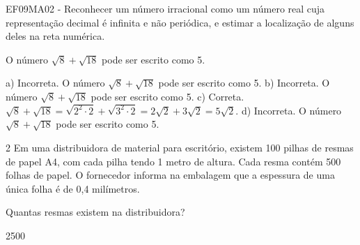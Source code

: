\begin{escolha}
\begin{boxmedio}
\begin{boxmedio}
{\begin{boxpeq}
\begin{boxpeq}
{\begin{boxpeq}
\begin{boxmedio}
\begin{boxmedio}
\begin{boxpeq}
\begin{boxmedio}
\begin{boxpeq}
\begin{boxpeq}
\begin{boxpeq}
\begin{boxpeq}
\begin{boxmedio}
{\begin{boxmedio}
\begin{boxmedio}
\begin{boxpeq}
\begin{boxmedio}
\begin{boxpeq}
\begin{boxpeq}
\begin{boxpeq}
\begin{escolha}
{\begin{boxmedio}
\begin{boxpeq}
\begin{boxpeq}
\begin{boxpeq}
\begin{boxpeq}
\begin{boxpeq}
\begin{boxmedio}
\begin{boxpeq}
\begin{boxpeq}
\begin{boxpeq}
{\begin{boxpeq}
\begin{boxmedio}
\begin{boxpeq}
\begin{boxpeq}
\begin{boxpeq}
{\begin{boxpeq}
\begin{boxmedio}
{\begin{boxpeq}
\begin{boxpeq}
\begin{boxmedio}
\begin{boxmedio}
\begin{boxpeq}
\begin{boxpeq}
{\begin{boxpeq}
\begin{boxpeq}
\begin{boxpeq}
\begin{boxpeq}
\begin{boxpeq}
\begin{escolha}
\begin{escolha}
{\begin{boxmedio}
\begin{boxpeq}
\begin{q°}
\begin{boxmedio}
\begin{boxpeq}
\begin{boxpeq}
\begin{boxmedio}
\begin{boxmedio}
\begin{boxmedio}
\begin{boxmedio}
{\begin{escolha}
\begin{escolha}
\begin{escolha}
\begin{escolha}
\begin{escolha}
\begin{escolha}
{EF09MA02 - Reconhecer um número irracional como um número real cuja
representação decimal é infinita e não periódica, e estimar a localização
de alguns deles na reta numérica. 

O número $\sqrt{8} + \sqrt{18}$ pode ser escrito como 5.

a) Incorreta. O número $\sqrt{8} + \sqrt{18}$ pode ser escrito 
como 5. 
b) Incorreta. O número $\sqrt{8} + \sqrt{18}$ pode ser escrito 
como 5. 
c) Correta. $\sqrt{8} + \sqrt{18} = \sqrt{2^{2} \cdot 2} + \sqrt{3^{2} \cdot 2} = 2\sqrt{2} + 3\sqrt{2} = 5\sqrt{2}.$
d) Incorreta. O número $\sqrt{8} + \sqrt{18}$ pode ser escrito 
como 5.} 

\num{2} Em uma distribuidora de material para escritório, existem 100 
pilhas de resmas de papel A4, com cada pilha tendo 1 metro de altura. Cada 
resma contém 500 folhas de papel. O fornecedor informa na embalagem que a 
espessura de uma única folha é de 0,4 milímetros.

Quantas resmas existem na distribuidora?

\begin{escolha}

\item 2500


\end{escolha}
\end{escolha}
\end{escolha}
\end{escolha}
\end{escolha}
\end{escolha}
\end{escolha}}
\end{boxmedio}
\end{boxmedio}
\end{boxmedio}
\end{boxmedio}
\end{boxpeq}
\end{boxpeq}
\end{boxmedio}
\end{q°}
\end{boxpeq}
\end{boxmedio}}
\end{escolha}
\end{escolha}
\end{boxpeq}
\end{boxpeq}
\end{boxpeq}
\end{boxpeq}
\end{boxpeq}}
\end{boxpeq}
\end{boxpeq}
\end{boxmedio}
\end{boxmedio}
\end{boxpeq}
\end{boxpeq}}
\end{boxmedio}
\end{boxpeq}}
\end{boxpeq}
\end{boxpeq}
\end{boxpeq}
\end{boxmedio}
\end{boxpeq}}
\end{boxpeq}
\end{boxpeq}
\end{boxpeq}
\end{boxmedio}
\end{boxpeq}
\end{boxpeq}
\end{boxpeq}
\end{boxpeq}
\end{boxpeq}
\end{boxmedio}}
\end{escolha}
\end{boxpeq}
\end{boxpeq}
\end{boxpeq}
\end{boxmedio}
\end{boxpeq}
\end{boxmedio}
\end{boxmedio}}
\end{boxmedio}
\end{boxpeq}
\end{boxpeq}
\end{boxpeq}
\end{boxpeq}
\end{boxmedio}
\end{boxpeq}
\end{boxmedio}
\end{boxmedio}
\end{boxpeq}}
\end{boxpeq}
\end{boxpeq}}
\end{boxmedio}
\end{boxmedio}
\end{escolha}
